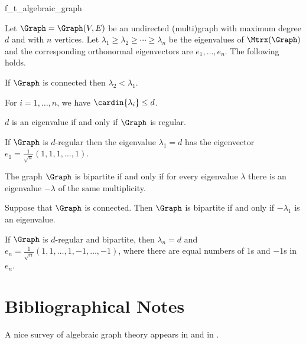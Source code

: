 \begin{fragment}{f_t_algebraic_graph}
\begin{theorem}
    Let $\Graph= \Graph(V,E)$ be an undirected (multi)graph with
    maximum degree $d$ and with $n$ vertices.  Let
    $\lambda_1\geq\lambda_2\geq \cdots \geq \lambda_n$ be the
    eigenvalues of $\Mtrx(\Graph)$ and the corresponding orthonormal
    eigenvectors are $e_1,\ldots, e_n$. The following holds.
    \begin{compactenumi}
        \item If $\Graph$ is connected then $\lambda_2 < \lambda_1$.

        \item For $i=1,\ldots, n$, we have
        $\cardin{\lambda_i} \leq d$.

        \item $d$ is an eigenvalue if and only if $\Graph$ is regular.

        \item If $\Graph$ is $d$-regular then the eigenvalue
        $\lambda_1=d$ has the eigenvector $e_1 = \frac{1}{\sqrt{n}}
        (1,1,1, \ldots, 1)$.

        \item The graph $\Graph$ is bipartite if and only if for every
        eigenvalue $\lambda$ there is an eigenvalue $-\lambda$ of the
        same multiplicity.

        \item Suppose that $\Graph$ is connected. Then $\Graph$ is bipartite if
        and only if $-\lambda_1$ is an eigenvalue.

        \item If $\Graph$ is $d$-regular and bipartite, then $\lambda_n =
        d$ and $e_n=\frac{1}{\sqrt{n}} ( 1,1, \ldots, 1, -1, \ldots,
        -1)$, where there are equal numbers of $1$s and $-1$s in
        $e_n$.
    \end{compactenumi}
\end{theorem}
\end{fragment}



\section{Bibliographical Notes}

A nice survey of algebraic graph theory appears in \cite{w-igt-01} and
in \cite{b-mgt-98}.


\ChapterEnd{}
 

